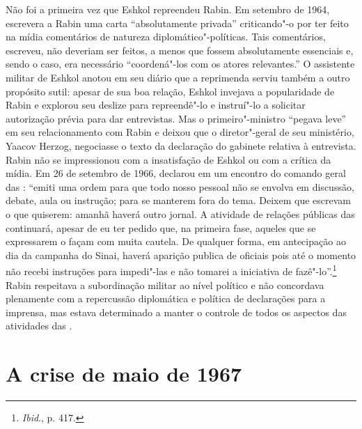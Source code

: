 Não foi a primeira vez que Eshkol repreendeu Rabin. Em setembro de 1964,
escrevera a Rabin uma carta ``absolutamente privada'' criticando"-o
por ter feito na mídia comentários de natureza diplomático"-políticas.
Tais comentários, escreveu, não deveriam ser feitos, a menos que fossem
absolutamente essenciais e, sendo o caso, era necessário ``coordená"-los
com os atores relevantes.'' O assistente militar de Eshkol anotou em seu
diário que a reprimenda serviu também a outro propósito sutil: apesar de
sua boa relação, Eshkol invejava a popularidade de Rabin e explorou seu
deslize para repreendê"-lo e instruí"-lo a solicitar autorização prévia
para dar entrevistas. Mas o primeiro"-ministro ``pegava leve'' em seu
relacionamento com Rabin e deixou que o diretor"-geral de seu ministério,
Yaacov Herzog, negociasse o texto da declaração do gabinete relativa à
entrevista. Rabin não se impressionou com a insatisfação de
Eshkol ou com a crítica da mídia. Em 26 de setembro de 1966, declarou em um
encontro do comando geral das : ``emiti uma ordem para que todo nosso
pessoal não se envolva em discussão, debate, aula ou instrução; para se
manterem fora do tema. Deixem que escrevam o que quiserem: amanhã haverá
outro jornal. A atividade de relações públicas das  continuará,
apesar de eu ter pedido que, na primeira fase, aqueles que se
expressarem o façam com muita cautela. De qualquer forma, em antecipação
ao dia da campanha do Sinai, haverá aparição publica de oficiais pois
até o momento não recebi instruções para impedi"-las e não tomarei a
iniciativa de fazê"-lo''.\footnote{\emph{Ibid}., p. 417.} Rabin respeitava a subordinação
militar ao nível político e não concordava plenamente com a repercussão
diplomática e política de declarações para a imprensa, mas estava
determinado a manter o controle de todos os aspectos das atividades das
.

\section{A crise de maio de 1967}


